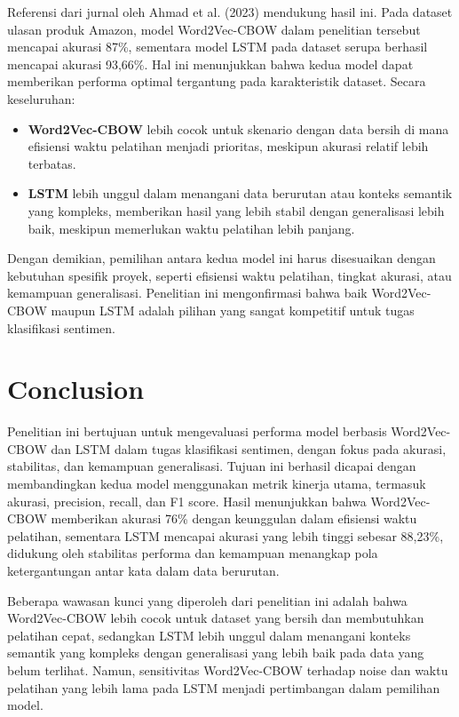 \documentclass[12pt,a4paper]{article}
\begin{document}
Referensi dari jurnal oleh Ahmad et al. (2023) mendukung hasil ini. Pada dataset ulasan produk Amazon, model Word2Vec-CBOW dalam penelitian tersebut mencapai akurasi 87\%, sementara model LSTM pada dataset serupa berhasil mencapai akurasi 93,66\%. Hal ini menunjukkan bahwa kedua model dapat memberikan performa optimal tergantung pada karakteristik dataset. Secara keseluruhan:

\begin{itemize}
    \item \textbf{Word2Vec-CBOW} lebih cocok untuk skenario dengan data bersih di mana efisiensi waktu pelatihan menjadi prioritas, meskipun akurasi relatif lebih terbatas.
    \item \textbf{LSTM} lebih unggul dalam menangani data berurutan atau konteks semantik yang kompleks, memberikan hasil yang lebih stabil dengan generalisasi lebih baik, meskipun memerlukan waktu pelatihan lebih panjang.
\end{itemize}

Dengan demikian, pemilihan antara kedua model ini harus disesuaikan dengan kebutuhan spesifik proyek, seperti efisiensi waktu pelatihan, tingkat akurasi, atau kemampuan generalisasi. Penelitian ini mengonfirmasi bahwa baik Word2Vec-CBOW maupun LSTM adalah pilihan yang sangat kompetitif untuk tugas klasifikasi sentimen.

\section{Conclusion}
Penelitian ini bertujuan untuk mengevaluasi performa model berbasis Word2Vec-CBOW dan LSTM dalam tugas klasifikasi sentimen, dengan fokus pada akurasi, stabilitas, dan kemampuan generalisasi. Tujuan ini berhasil dicapai dengan membandingkan kedua model menggunakan metrik kinerja utama, termasuk akurasi, precision, recall, dan F1 score. Hasil menunjukkan bahwa Word2Vec-CBOW memberikan akurasi 76\% dengan keunggulan dalam efisiensi waktu pelatihan, sementara LSTM mencapai akurasi yang lebih tinggi sebesar 88,23\%, didukung oleh stabilitas performa dan kemampuan menangkap pola ketergantungan antar kata dalam data berurutan.

Beberapa wawasan kunci yang diperoleh dari penelitian ini adalah bahwa Word2Vec-CBOW lebih cocok untuk dataset yang bersih dan membutuhkan pelatihan cepat, sedangkan LSTM lebih unggul dalam menangani konteks semantik yang kompleks dengan generalisasi yang lebih baik pada data yang belum terlihat. Namun, sensitivitas Word2Vec-CBOW terhadap noise dan waktu pelatihan yang lebih lama pada LSTM menjadi pertimbangan dalam pemilihan model.
\end{document}
